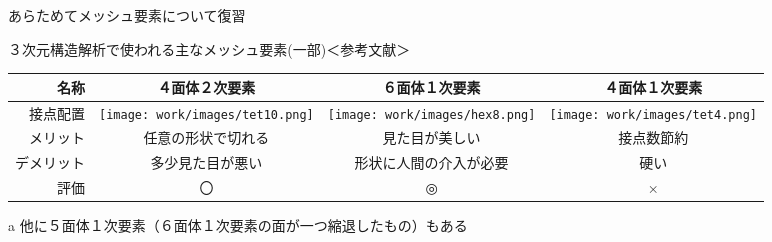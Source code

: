 \begin{frame}{あらためてメッシュ要素について復習}
  \begin{threeparttable}
      \caption{３次元構造解析で使われる主なメッシュ要素(一部)＜参考文献\cite{handbook}＞}
      \vspace{-5mm}
      \begin{tabular}{|r|c|c|c|} %
          \hline
          名称       & ４面体２次要素 & ６面体１次要素\tnote{a} & ４面体１次要素 \\
          \hline
	      接点配置 \vspace{-0.5mm}   &  \texttt{[image: work/images/tet10.png]}
                     & \texttt{[image: work/images/hex8.png]} 
                     & \texttt{[image: work/images/tet4.png]}  \\
          \hline
          メリット   & 任意の形状で切れる & 見た目が美しい & 接点数節約 \\
          \hline
          デメリット & 多少見た目が悪い   & 形状に人間の介入が必要 & 硬い \\
          \hline
          評価       &   〇               & ◎              & × \\
          \hline
    \end{tabular}
    \begin{tablenotes} %
      \item[a] 他に５面体１次要素（６面体１次要素の面が一つ縮退したもの）もある
    \end{tablenotes}
  \end{threeparttable}
\end{frame}
